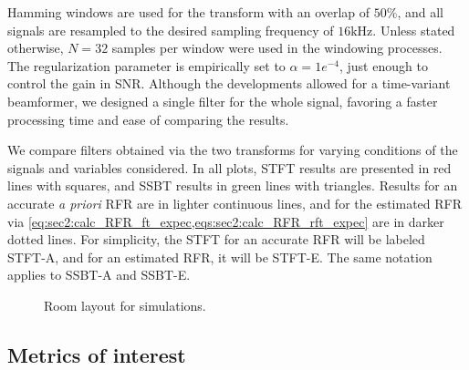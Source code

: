 Hamming windows are used for the transform with an overlap of $50\%$, and all signals are resampled to the desired sampling frequency of $16\si{\kilo\hertz}$. Unless stated otherwise, $N = 32$ samples per window were used in the windowing processes. The regularization parameter is empirically set to $\alpha = 1e^{-4}$, just enough to control the gain in SNR. Although the developments allowed for a time-variant beamformer, we designed a single filter for the whole signal, favoring a faster processing time and ease of comparing the results.

We compare filters obtained via the two transforms for varying conditions of the signals and variables considered. In all plots, STFT results are presented in red lines with squares, and SSBT results in green lines with triangles. Results for an accurate \textit{a priori} RFR are in lighter continuous lines, and for the estimated RFR via \cref{eq:sec2:calc_RFR_ft_expec,eqs:sec2:calc_RFR_rft_expec} are in darker dotted lines. For simplicity, the STFT for an accurate RFR will be labeled STFT-A, and for an estimated RFR, it will be STFT-E. The same notation applies to SSBT-A and SSBT-E.

\begin{figure}[!t]
	\centering
	
	\caption{Room layout for simulations.}
	\label{fig:room_layout}
\end{figure}
%

\subsection{Metrics of interest}


